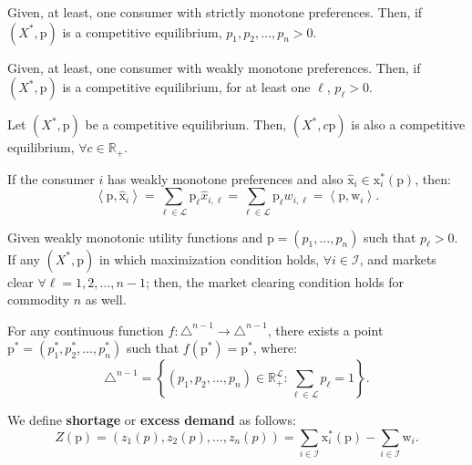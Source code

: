 \documentclass[8pt,a4paper]{extarticle}
\begin{document}
\begin{multicols}{3}
  \begin{boxprop}
    Given, at least, one consumer with strictly monotone preferences. Then, if $(X^*, \mathrm{p})$ is a competitive equilibrium, $p_1, p_2, \ldots, p_n > 0$.
  \end{boxprop}

  \begin{boxprop}
    Given, at least, one consumer with weakly monotone preferences. Then, if $(X^*, \mathrm{p})$ is a competitive equilibrium, for at least one $\ell$, $p_\ell > 0$.
  \end{boxprop}

  \begin{boxprop}
    Let $(X^*, \mathrm{p})$ be a competitive equilibrium. Then, $(X^*, c\mathrm{p})$ is also a competitive equilibrium, $\forall c \in \mathbb{R}_+$.
  \end{boxprop}

  \begin{boxtheo}
    If the consumer $i$ has weakly monotone preferences and also $\hat{\mathrm{x}}_i \in \mathrm{x}^*_i (\mathrm{p})$, then:
    \[
      \left\langle\mathrm{p},\hat{\mathrm{x}}_i\right\rangle = \sum_{\ell \in \mathcal{L}} \mathrm{p}_\ell \hat{x}_{i, \ell} = \sum_{\ell \in \mathcal{L}} \mathrm{p}_\ell w_{i, \ell} = \left\langle\mathrm{p},\mathrm{w}_i\right\rangle
      .\]
  \end{boxtheo}

  \begin{boxcor}
    Given weakly monotonic utility functions and $\mathrm{p} = (p_1, \ldots, p_n)$ such that $p_\ell > 0$. If any $(X^*,\mathrm{p})$ in which maximization condition holds, $\forall i \in \mathcal{I}$, and markets clear $\forall \ell = 1, 2, \ldots, n - 1$; then, the market clearing condition holds for commodity $n$ as well.
  \end{boxcor}

  \begin{boxtheo}
    For any continuous function $f : \triangle^{n - 1} \to \triangle^{n - 1}$, there exists a point $\mathrm{p}^* = (p^*_1, p^*_2, \ldots, p^*_n)$ such that $f(\mathrm{p}^*) = \mathrm{p}^*$, where: $$\displaystyle \triangle^{n - 1} = \left\{(p_1, p_2, \ldots, p_n) \in \mathbb{R}_+^\mathcal{L} : \sum_{\ell \in \mathcal{L}} p_\ell = 1 \right\}.$$
  \end{boxtheo}

  \begin{boxdef}[Shortage]
    We define \textbf{shortage} or \textbf{excess demand} as follows:
    \[
      Z(\mathrm{p}) = (z_1(p), z_2(p), \ldots, z_n(p)) = \sum_{i \in \mathcal{I}} \mathrm{x}^*_i(\mathrm{p}) - \sum_{i \in \mathcal{I}} \mathrm{w}_i
      .\]
  \end{boxdef}


\end{multicols}
\end{document}
